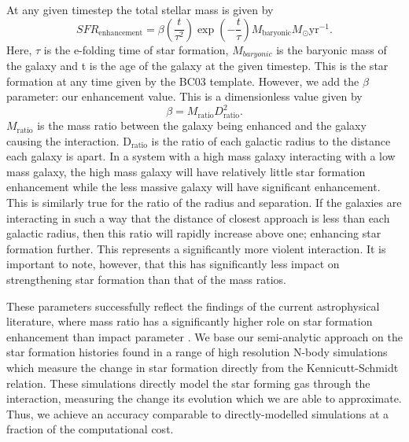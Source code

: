 At any given timestep the total stellar mass is given by
\begin{equation}\label{Total_SFR}
    SFR_{\text{enhancement}} = \beta (\frac{t}{\tau^{2}}) \exp(-\frac{t}{\tau}) M_{\text{baryonic}} M_{\odot} \text{yr}^{-1}.
\end{equation}
Here, $\tau$ is the e-folding time of star formation, $M_{baryonic}$ is the baryonic mass of the galaxy and t is the age of the galaxy at the given timestep. This is the star formation at any time given by the BC03 template. However, we add the $\beta$ parameter: our enhancement value. This is a dimensionless value given by
\begin{equation}\label{enhancement_param}
    \beta = M_{\text{ratio}} D_{\text{ratio}}^{2}.
\end{equation}
$M_{\text{ratio}}$ is the mass ratio between the galaxy being enhanced and the galaxy causing the interaction. D$_{\text{ratio}}$ is the ratio of each galactic radius to the distance each galaxy is apart. In a system with a high mass galaxy interacting with a low mass galaxy, the high mass galaxy will have relatively little star formation enhancement while the less massive galaxy will have significant enhancement. This is similarly true for the ratio of the radius and separation. If the galaxies are interacting in such a way that the distance of closest approach is less than each galactic radius, then this ratio will rapidly increase above one; enhancing star formation further. This represents a significantly more violent interaction. It is important to note, however, that this has significantly less impact on strengthening star formation than that of the mass ratios. 

These parameters successfully reflect the findings of the current astrophysical literature, where mass ratio has a significantly higher role on star formation enhancement than impact parameter \citep{2003ApJ...582..668B, 2008MNRAS.391.1137L, 2008MNRAS.385.1903L}. We base our semi-analytic approach on the star formation histories found in a range of high resolution N-body simulations \citep{1996ApJ...464..641M, 2000MNRAS.312..859S, 2019MNRAS.490.2139R} which measure the change in star formation directly from the Kennicutt-Schmidt \citep{1998ApJ...498..541K} relation. These simulations directly model the star forming gas through the interaction, measuring the change its evolution which we are able to approximate. Thus, we achieve an accuracy comparable to directly-modelled simulations at a fraction of the computational cost.

